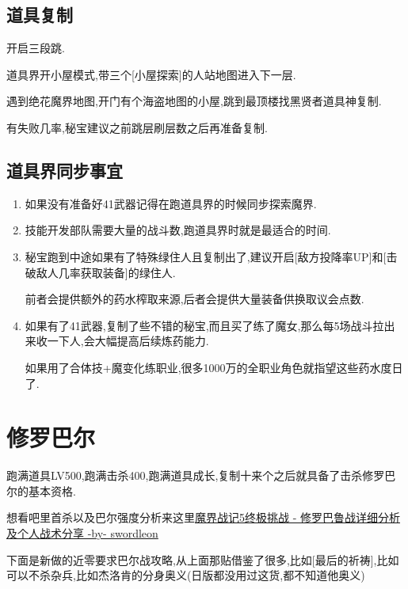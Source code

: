 	\subsection{道具复制}

	开启三段跳.

	道具界开小屋模式,带三个[小屋探索]的人站地图进入下一层.

	遇到绝花魔界地图,开门有个海盗地图的小屋,跳到最顶楼找黑贤者道具神复制.

	有失败几率,秘宝建议之前跳层刷层数之后再准备复制.


	\subsection{道具界同步事宜}

	\begin{enumerate}
		\item
		如果没有准备好41武器记得在跑道具界的时候同步探索魔界.

		\item
		技能开发部队需要大量的战斗数,跑道具界时就是最适合的时间.


		\item
		秘宝跑到中途如果有了特殊绿住人且复制出了,建议开启[敌方投降率UP]和[击破敌人几率获取装备]的绿住人.

		前者会提供额外的药水榨取来源,后者会提供大量装备供换取议会点数.

		\item
		如果有了41武器,复制了些不错的秘宝,而且买了练了魔女,那么每5场战斗拉出来收一下人,会大幅提高后续炼药能力.

		如果用了合体技+魔变化练职业,很多1000万的全职业角色就指望这些药水度日了.

	\end{enumerate}


	\newpage

	\section{修罗巴尔}

	跑满道具LV500,跑满击杀400,跑满道具成长,复制十来个之后就具备了击杀修罗巴尔的基本资格.

	想看吧里首杀以及巴尔强度分析来这里\href{http://tieba.baidu.com/p/3949061316}{魔界战记5终极挑战 - 修罗巴鲁战详细分析及个人战术分享 -by- swordleon }

	下面是新做的近零要求巴尔战攻略,从上面那贴借鉴了很多,比如[最后的祈祷],比如可以不杀杂兵,比如杰洛肯的分身奥义(日版都没用过这货,都不知道他奥义)


